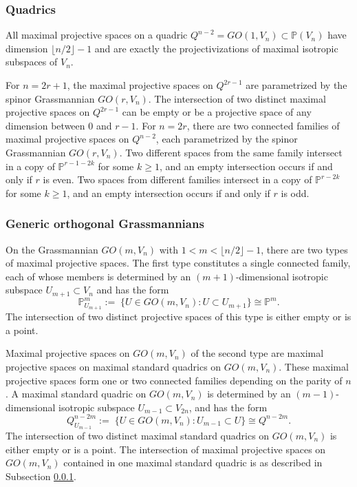\documentclass[12pt]{amsart}
\def\PP {{\mathbb P}}     %
\begin{document}
\subsubsection{Quadrics}\label{Sec max proj in quadrics} All maximal projective spaces on a quadric $Q^{n-2}=GO(1,V_n)\subset \PP(V_n)$ have dimension $\lfloor n/2\rfloor-1$ and are exactly the projectivizations of maximal isotropic subspaces of $V_n$.

For $n=2r+1$, the maximal projective spaces on $Q^{2r-1}$ are parametrized by the spinor Grassmannian $GO(r,V_{n})$. The intersection of two distinct maximal projective spaces on $Q^{2r-1}$ can be empty or be a projective space of any dimension between $0$ and $r-1$. For $n=2r$, there are two connected families of maximal projective spaces on $Q^{n-2}$, each parametrized by the spinor Grassmannian $GO(r,V_{n})$. Two different spaces from the same family intersect in a copy of $\PP^{r-1-2k}$ for some $k\geq 1$, and an empty intersection occurs if and only if $r$ is even. Two spaces from different families intersect in a copy of $\PP^{r-2k}$ for some $k\geq 1$, and an empty intersection occurs if and only if $r$ is odd.


\subsubsection{Generic orthogonal Grassmannians}\label{Sec MaxProj on GO generic} On the Grassmannian $GO(m,V_{n})$ with $1<m< \lfloor n/2\rfloor-1$, there are two types of maximal projective spaces. The first type constitutes a single connected family, each of whose members is determined by an $(m+1)$-dimensional isotropic subspace $U_{m+1}\subset V_{n}$ and has the form
$$
\PP^{m}_{U_{m+1}} :=\;\{ U\in GO(m,V_{n}): U\subset U_{m+1} \} \cong \PP^{m}.
$$
The intersection of two distinct projective spaces of this type is either empty or is a point.

Maximal projective spaces on $GO(m,V_n)$ of the second type are maximal projective spaces on maximal standard quadrics on $GO(m,V_n)$. These maximal projective spaces form one or two connected families depending on the parity of $n$. A maximal standard quadric on $GO(m,V_n)$ is determined by an $(m-1)$-dimensional isotropic subspace $U_{m-1}\subset V_{2n}$, and has the form
$$
Q^{n-2m}_{U_{m-1}} :=\;\{ U\in GO(m,V_n): U_{m-1}\subset U \} \cong Q^{n-2m}.
$$
The intersection of two distinct maximal standard quadrics on $GO(m,V_n)$ is either empty or is a point. The intersection of maximal projective spaces on $GO(m,V_n)$ contained in one maximal standard quadric is as described in Subsection \ref{Sec max proj in quadrics}.
\end{document}
